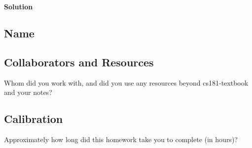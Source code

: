\documentclass[submit]{harvardml}
\begin{document}
\textbf{Solution}

\newpage
\newpage

\subsection*{Name}

\subsection*{Collaborators and Resources}
Whom did you work with, and did you use any resources beyond cs181-textbook and your notes?

\subsection*{Calibration}
Approximately how long did this homework take you to complete (in hours)? 
\end{document}
